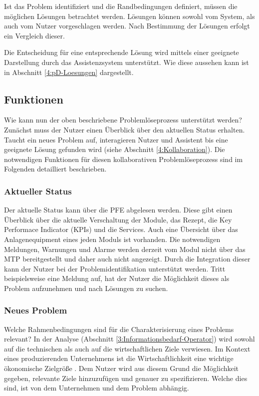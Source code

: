 Ist das Problem identifiziert und die Randbedingungen definiert, müssen die möglichen Lösungen betrachtet werden. Lösungen können sowohl vom System, als auch vom Nutzer vorgeschlagen werden. Nach Bestimmung der Lösungen erfolgt ein Vergleich dieser.

Die Entscheidung für eine entsprechende Lösung wird mittels einer geeignete Darstellung durch das Assistenzsystem unterstützt. Wie diese aussehen kann ist in Abschnitt \ref{4:pD-Loesungen} dargestellt.

\subsection{Funktionen}
Wie kann nun der oben beschriebene Problemlöseprozess unterstützt werden? Zunächst muss der Nutzer einen Überblick über den aktuellen Status erhalten. Taucht ein neues Problem auf, interagieren Nutzer und Assistent bis eine geeignete Lösung gefunden wird (siehe Abschnitt \ref{4:Kollaboration}). Die notwendigen Funktionen für diesen kollaborativen Problemlöseprozess sind im Folgenden detailliert beschrieben.

\subsubsection*{Aktueller Status}
Der aktuelle Status kann über die PFE abgelesen werden. Diese gibt einen Überblick über die aktuelle Verschaltung der Module, das Rezept, die Key Performace Indicator (KPIs) und die Services. Auch eine Übersicht über das Anlagenequipment eines jeden Moduls ist vorhanden. Die notwendigen Meldungen, Warnungen und Alarme werden derzeit vom Modul nicht über das MTP bereitgestellt und daher auch nicht angezeigt. Durch die Integration dieser kann der Nutzer bei der Problemidentifikation unterstützt werden. Tritt beispielsweise eine Meldung auf, hat der Nutzer die Möglichkeit dieses als Problem aufzunehmen und nach Lösungen zu suchen.

\subsubsection*{Neues Problem}
Welche Rahmenbedingungen sind für die Charakterisierung eines Problems relevant? In der Analyse (Abschnitt \ref{3:Informationsbedarf-Operator}) wird sowohl auf die technischen als auch auf die wirtschaftlichen Ziele verwiesen. Im Kontext eines produzierenden Unternehmens ist die Wirtschaftlichkeit eine wichtige ökonomische Zielgröße \cite{Bloech2014}. Dem Nutzer wird aus diesem Grund die Möglichkeit gegeben, relevante Ziele hinzuzufügen und genauer zu spezifizieren. Welche dies sind, ist von dem Unternehmen und dem Problem abhängig.


